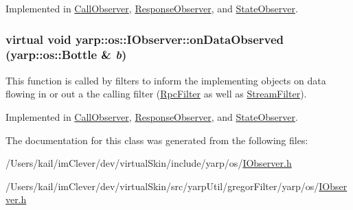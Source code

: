 Implemented in \hyperlink{class_call_observer_abc1974fe2f04101dbbb1ae3ce83e7bfe}{CallObserver}, \hyperlink{class_response_observer_a2d847c448b31b5aa880b9282f7bf223d}{ResponseObserver}, and \hyperlink{class_state_observer_af104fa553abf31754d9acc084e9aa31f}{StateObserver}.\hypertarget{classyarp_1_1os_1_1_i_observer_a4829e5a6f2ba6666b9539a4a30f20790}{
\subsubsection[{onDataObserved}]{\setlength{\rightskip}{0pt plus 5cm}virtual void yarp::os::IObserver::onDataObserved (yarp::os::Bottle \& {\em b})}}
\label{classyarp_1_1os_1_1_i_observer_a4829e5a6f2ba6666b9539a4a30f20790}
This function is called by filters to inform the implementing objects on data flowing in or out a the calling filter (\hyperlink{classyarp_1_1os_1_1_rpc_filter}{RpcFilter} as well as \hyperlink{classyarp_1_1os_1_1_stream_filter}{StreamFilter}). 

Implemented in \hyperlink{class_call_observer_abc1974fe2f04101dbbb1ae3ce83e7bfe}{CallObserver}, \hyperlink{class_response_observer_a2d847c448b31b5aa880b9282f7bf223d}{ResponseObserver}, and \hyperlink{class_state_observer_af104fa553abf31754d9acc084e9aa31f}{StateObserver}.

The documentation for this class was generated from the following files:\begin{DoxyCompactItemize}
\item 
/Users/kail/imClever/dev/virtualSkin/include/yarp/os/\hyperlink{include_2yarp_2os_2_i_observer_8h}{IObserver.h}\item 
/Users/kail/imClever/dev/virtualSkin/src/yarpUtil/gregorFilter/yarp/os/\hyperlink{src_2yarp_util_2gregor_filter_2yarp_2os_2_i_observer_8h}{IObserver.h}\end{DoxyCompactItemize}
